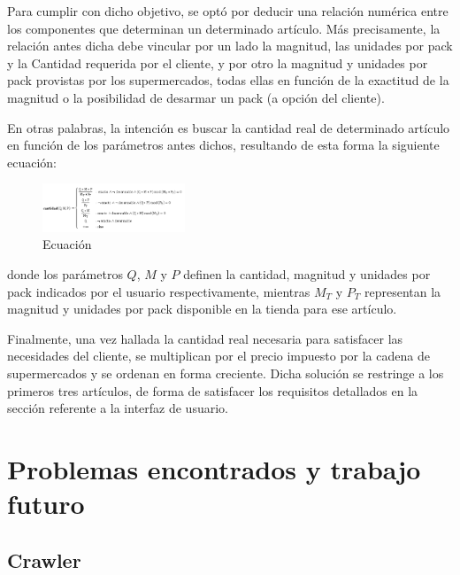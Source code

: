 \documentclass[12pt]{article} %
\begin{document}
Para cumplir con dicho objetivo, se optó por deducir una relación numérica entre los componentes que determinan un determinado artículo. Más precisamente, la relación antes dicha debe vincular por un lado la magnitud, las unidades por pack y la Cantidad requerida por el cliente, y por otro la magnitud y unidades por pack provistas por los supermercados, todas ellas en función de la exactitud de la magnitud o la posibilidad de desarmar un pack (a opción del cliente). 

En otras palabras, la intención es buscar la cantidad real de determinado artículo en función de los parámetros antes dichos, resultando de esta forma la siguiente ecuación:
\begin{figure} %
  \begin{center}
    \includegraphics[width=0.38\textwidth]{ecuacion}
  \end{center}
  \caption{Ecuación}
\end{figure}

donde los parámetros $Q$, $M$ y $P$ definen la cantidad, magnitud y unidades por pack indicados por el usuario respectivamente, mientras $M_T$ y $P_T$ representan la magnitud y unidades por pack disponible en la tienda para ese artículo.

Finalmente, una vez hallada la cantidad real necesaria para satisfacer las necesidades del cliente, se multiplican por el precio impuesto por la cadena de supermercados y se ordenan en forma creciente. Dicha solución se restringe a los primeros tres artículos, de forma de satisfacer los requisitos detallados en la sección referente a la interfaz de usuario.


\section{Problemas encontrados y trabajo futuro}


\subsection{Crawler}
\end{document}
